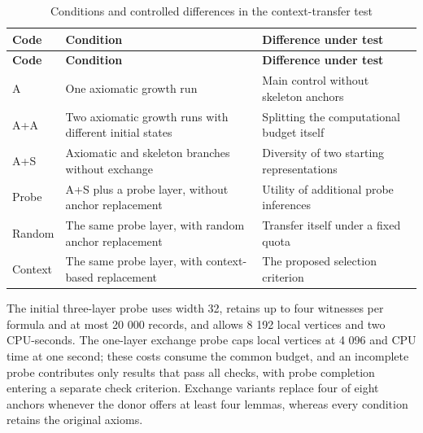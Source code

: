 \documentclass[pdflatex,sn-basic,Numbered]{sn-jnl}
\begin{document}
\begin{longtable}[]{@{}
  >{\raggedright\arraybackslash}p{}
  >{\raggedright\arraybackslash}p{}
  >{\raggedright\arraybackslash}p{}@{}}
\caption{Conditions and controlled differences in the context-transfer test}\label{tab:11}\tabularnewline
\toprule\noalign{}
\begin{minipage}[b]{\linewidth}\raggedright
\textbf{Code}
\end{minipage} & \begin{minipage}[b]{\linewidth}\raggedright
\textbf{Condition}
\end{minipage} & \begin{minipage}[b]{\linewidth}\raggedright
\textbf{Difference under test}
\end{minipage} \\
\midrule\noalign{}
\endfirsthead
\toprule\noalign{}
\begin{minipage}[b]{\linewidth}\raggedright
\textbf{Code}
\end{minipage} & \begin{minipage}[b]{\linewidth}\raggedright
\textbf{Condition}
\end{minipage} & \begin{minipage}[b]{\linewidth}\raggedright
\textbf{Difference under test}
\end{minipage} \\
\midrule\noalign{}
\endhead
\bottomrule\noalign{}
\endlastfoot
A & One axiomatic growth run & Main control without skeleton anchors \\
A+A & Two axiomatic growth runs with different initial states & Splitting the computational budget itself \\
A+S & Axiomatic and skeleton branches without exchange & Diversity of two starting representations \\
Probe & A+S plus a probe layer, without anchor replacement & Utility of additional probe inferences \\
Random & The same probe layer, with random anchor replacement & Transfer itself under a fixed quota \\
Context & The same probe layer, with context-based replacement & The proposed selection criterion \\
\end{longtable}

\endgroup

The initial three-layer probe uses width 32, retains up to four witnesses per formula and at most 20 000 records, and allows 8 192 local vertices and two CPU-seconds. The one-layer exchange probe caps local vertices at 4 096 and CPU time at one second; these costs consume the common budget, and an incomplete probe contributes only results that pass all checks, with probe completion entering a separate check criterion. Exchange variants replace four of eight anchors whenever the donor offers at least four lemmas, whereas every condition retains the original axioms.
\end{document}
